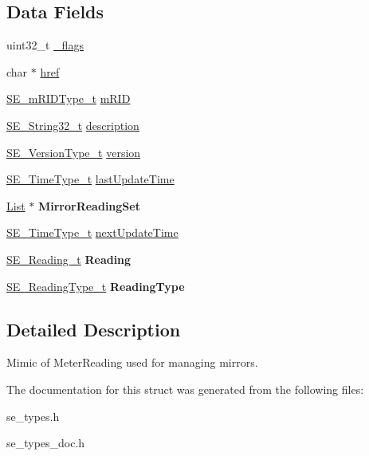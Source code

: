 \subsection*{Data Fields}
\begin{DoxyCompactItemize}
\item 
uint32\+\_\+t \hyperlink{group__MirrorMeterReading_gabcc4d1dbd86cc1a59a5239a676c92dbd}{\+\_\+flags}
\item 
char $\ast$ \hyperlink{group__MirrorMeterReading_ga708f7129eb6e118a8d938112b6417c62}{href}
\item 
\hyperlink{group__mRIDType_gac74622112f3a388a2851b2289963ba5e}{S\+E\+\_\+m\+R\+I\+D\+Type\+\_\+t} \hyperlink{group__MirrorMeterReading_ga3848167c7a5f04fcb8cefac37960ee92}{m\+R\+ID}
\item 
\hyperlink{group__String32_gac9f59b06b168b4d2e0d45ed41699af42}{S\+E\+\_\+\+String32\+\_\+t} \hyperlink{group__MirrorMeterReading_ga959c2527270a7004344e91b2dbe90811}{description}
\item 
\hyperlink{group__VersionType_ga4b8d27838226948397ed99f67d46e2ae}{S\+E\+\_\+\+Version\+Type\+\_\+t} \hyperlink{group__MirrorMeterReading_gac080719eb59601dcaf5e053c111f3744}{version}
\item 
\hyperlink{group__TimeType_ga6fba87a5b57829b4ff3f0e7638156682}{S\+E\+\_\+\+Time\+Type\+\_\+t} \hyperlink{group__MirrorMeterReading_ga115c89d7cc44634e378828a2b26f213f}{last\+Update\+Time}
\item 
\hyperlink{structList}{List} $\ast$ {\bfseries Mirror\+Reading\+Set}
\item 
\hyperlink{group__TimeType_ga6fba87a5b57829b4ff3f0e7638156682}{S\+E\+\_\+\+Time\+Type\+\_\+t} \hyperlink{group__MirrorMeterReading_ga2d98cafe8eb774641dd6798ade23d9ee}{next\+Update\+Time}
\item 
\hyperlink{structSE__Reading__t}{S\+E\+\_\+\+Reading\+\_\+t} {\bfseries Reading}
\item 
\hyperlink{structSE__ReadingType__t}{S\+E\+\_\+\+Reading\+Type\+\_\+t} {\bfseries Reading\+Type}
\end{DoxyCompactItemize}


\subsection{Detailed Description}
Mimic of Meter\+Reading used for managing mirrors. 

The documentation for this struct was generated from the following files\+:\begin{DoxyCompactItemize}
\item 
se\+\_\+types.\+h\item 
se\+\_\+types\+\_\+doc.\+h\end{DoxyCompactItemize}
